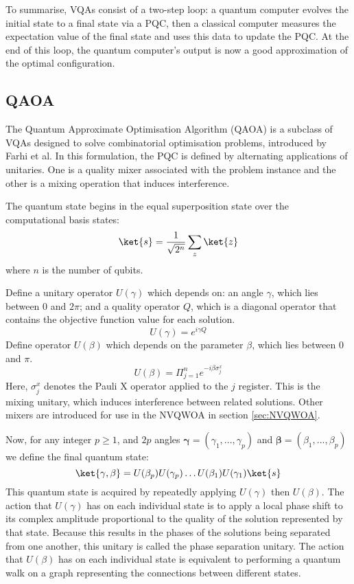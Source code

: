 To summarise, VQAs consist of a two-step loop: a quantum computer evolves the initial state to a final state via a PQC, then a classical computer measures the expectation value of the final state and uses this data to update the PQC. At the end of this loop, the quantum computer's output is now a good approximation of the optimal configuration.

\subsection{QAOA}
The Quantum Approximate Optimisation Algorithm (QAOA) is a subclass of VQAs designed to solve combinatorial optimisation problems, introduced by Farhi et al. \cite{QAOA} In this formulation, the PQC is defined by alternating applications of unitaries. One is a quality mixer associated with the problem instance and the other is a mixing operation that induces interference.

The quantum state begins in the equal superposition state over the computational basis states:
$$\ket{s}=\frac{1}{\sqrt{2^n}}\sum_{z}\ket{z}$$
where $n$ is the number of qubits.

Define a unitary operator $U(\gamma)$ which depends on: an angle $\gamma$, which lies between 0 and $2\pi$; and a quality operator $Q$, which is a diagonal operator that contains the objective function value for each solution.
$$U(\gamma)=e^{i\gamma Q}$$
Define operator $U(\beta)$ which depends on the parameter $\beta$, which lies between 0 and $\pi$.
$$U(\beta)=\Pi_{j=1}^{n} e^{-i\beta \sigma_j^x}$$
Here, $\sigma_j^x$ denotes the Pauli X operator applied to the $j$ register. This is the mixing unitary, which induces interference between related solutions. Other mixers are introduced for use in the NVQWOA in section \ref{sec:NVQWOA}.

Now, for any integer $p\geq1$, and $2p$ angles $\mathbf{\gamma}=(\gamma_1, ...,\gamma_p)$ and $\mathbf{\beta}=(\beta_1, ...,\beta_p)$ we define the final quantum state:
$$\ket{\mathbf{\gamma},\mathbf{\beta}}=U(\beta_p)U(\gamma_p)\dots U(\beta_1)U(\gamma_1) \ket{s}$$
This quantum state is acquired by repeatedly applying $U(\gamma)$ then $U(\beta)$. The action that $U(\gamma)$ has on each individual state is to apply a local phase shift to its complex amplitude proportional to the quality of the solution represented by that state. Because this results in the phases of the solutions being separated from one another, this unitary is called the phase separation unitary. The action that $U(\beta)$ has on each individual state is equivalent to performing a quantum walk on a graph representing the connections between different states.

